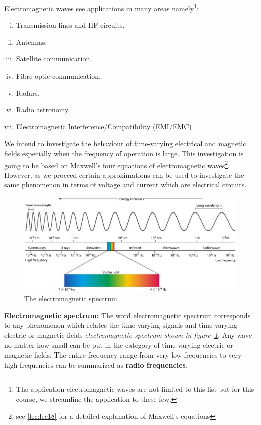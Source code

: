 Electromagnetic waves see applications in many areas namely\footnote{The application electromagnetic waves are not limited to this list but for this course, we streamline the application to these few.}:
\begin{enumerate}[(i)]
\item Transmission lines and HF circuits.
\item Antennas.
\item Satellite communication.
\item Fibre-optic communication.
\item Radars.
\item Radio astronomy.
\item Electromagnetic Interference/Compatibility (EMI/EMC)
\end{enumerate}

We intend to investigate the behaviour of time-varying electrical and magnetic fields especially when the frequency of operation is large. This investigation is going to be based on Maxwell's four equations of electromagnetic waves\footnote{see \autoref{lec:lec18} for a detailed explanation of Maxwell's equations}. However, as we proceed certain approximations can be used to investigate the same phenomenon in terms of voltage and current which are electrical circuits.

\begin{figure}[h]
\centering
\includegraphics[width=1\linewidth]{./graphics/electromagneticspectrum}
\caption{The electromagnetic spectrum}
\label{fig:electromagneticspectrum}
\end{figure}

\textbf{Electromagnetic spectrum:} The word electromagnetic spectrum corresponds to any phenomenon which relates the time-varying signals and time-varying electric or magnetic fields \textit{electromagnetic spectrum shown in figure~\ref{fig:electromagneticspectrum}}. Any wave no matter how small can be put in the category of time-varying electric or magnetic fields. The entire frequency range from very low frequencies to very high frequencies can be summarized as \textbf{radio frequencies}.

